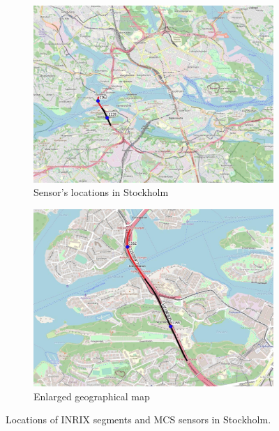 \documentclass[english]{kththesis}
\begin{document}
\begin{figure}[!ht]
    \centering
    \begin{subfigure}{0.49\textwidth}
        \centering
        \includegraphics[width=\textwidth]{inrix_mcs_location_a.png}
        \caption{Sensor's locations in Stockholm}
    \end{subfigure}
    \hfill
    \begin{subfigure}{0.49\textwidth}
        \centering
        \includegraphics[width=\textwidth]{inrix_mcs_location_b.png}
        \caption{Enlarged geographical map}
    \end{subfigure}
    \caption{Locations of INRIX segments and MCS sensors in Stockholm.}
    \label{fig:inrixMcsLocation}
\end{figure}
\end{document}
